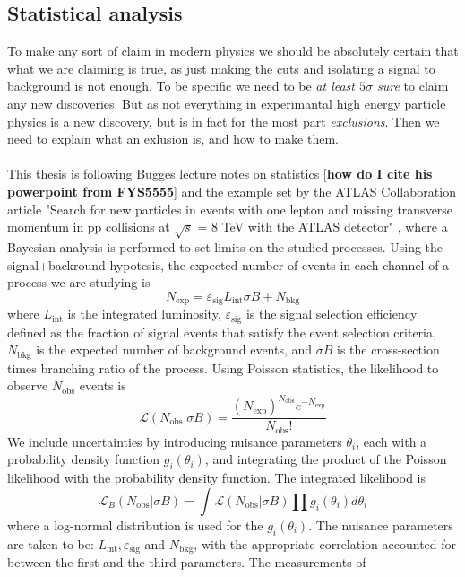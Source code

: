 \documentclass[14pt, a4paper]{book}
\begin{document}
\subsection{Statistical analysis}
To make any sort of claim in modern physics we should be absolutely certain that what we are claiming is true, as just making the cuts and isolating a signal to background is not enough. To be specific we need to be \textit{at least $5\sigma$ sure} to claim any new discoveries. 
But as not everything in experimantal high energy particle physics is a new discovery, but is in fact for the most part \textit{exclusions}. Then we need to explain what an exlusion is, and how to make them. \\ 
\\This thesis is following Bugges lecture notes on statistics [\textbf{how do I cite his powerpoint from FYS5555}] and the example set by the ATLAS Collaboration article "Search for new particles in events with one lepton and missing transverse momentum in pp collisions at $\sqrt s$ = 8 TeV with the ATLAS detector" \cite{Stat},
where a Bayesian analysis is performed to set limits on the studied processes. Using the signal+backround hypotesis, the expected number of events in each channel of a process we are studying is 
$$
    N_{\text{exp}} = \varepsilon_{\text{sig}}L_{\text{int}}\sigma B + N_{\text{bkg}}
$$
where $L_{\text{int}}$ is the integrated luminosity, $\varepsilon_{\text{sig}}$ is the signal selection efficiency defined as the fraction of signal events that satisfy the event selection criteria, $N_{\text{bkg}}$ is the expected number of background events, and $\sigma B$ is the 
cross-section times branching ratio of the process. Using Poisson statistics, the likelihood to observe $N_{\text{obs}}$ events is
\begin{equation}\label{eq:observed_events_prob}
    \mathcal{L}(N_{\text{obs}}\vert \sigma B) = \frac{(N_{\text{exp}})^{N_{\text{obs}}}e^{-N_{\text{exp}}}}{N_{\text{obs}}!}
\end{equation}
We include uncertainties by introducing nuisance parameters $\theta_i$, each with a probability density function $g_i(\theta_i)$, and integrating the product of the Poisson likelihood with the probability density function. The integrated likelihood is
\begin{equation}\label{eq:observed_events_nuisance}
    \mathcal{L}_B(N_{\text{obs}}\vert \sigma B)=\int\mathcal{L}(N_{\text{obs}}\vert \sigma B)\prod g_i(\theta_i)d\theta_i
\end{equation}
where a log-normal distribution is used for the $g_i(\theta_i)$. The nuisance parameters are taken to be: $L_{\text{int}}, \varepsilon_{\text{sig}}$ and $N_{\text{bkg}}$, with the appropriate correlation accounted for between the first and the third parameters. The measurements of 
\end{document}
